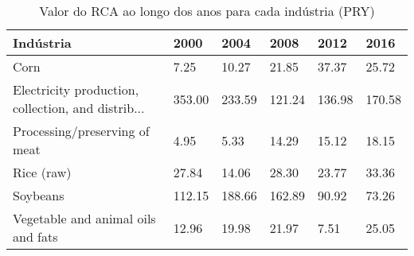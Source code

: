 \begin{table}
\centering
\caption{Valor do RCA ao longo dos anos para cada indústria (PRY)}
\label{tab:ex3-tempo-PRY}
\begin{tabular}{p{6cm}p{1.5cm}p{1.5cm}p{1.5cm}p{1.5cm}p{1.5cm}}
\toprule
                                         Indústria &   2000 &   2004 &   2008 &   2012 &   2016 \\
\midrule
                                              Corn &   7.25 &  10.27 &  21.85 &  37.37 &  25.72 \\
Electricity production, collection, and distrib... & 353.00 & 233.59 & 121.24 & 136.98 & 170.58 \\
                     Processing/preserving of meat &   4.95 &   5.33 &  14.29 &  15.12 &  18.15 \\
                                        Rice (raw) &  27.84 &  14.06 &  28.30 &  23.77 &  33.36 \\
                                          Soybeans & 112.15 & 188.66 & 162.89 &  90.92 &  73.26 \\
                Vegetable and animal oils and fats &  12.96 &  19.98 &  21.97 &   7.51 &  25.05 \\
\bottomrule
\end{tabular}
\end{table}
